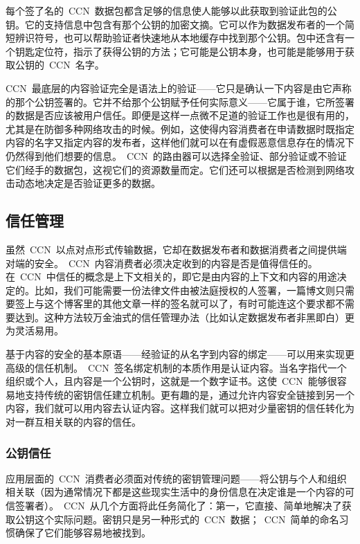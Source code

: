 每个签了名的~CCN~数据包都含足够的信息使人能够以此获取到验证此包的公钥。它的支持信息中包含有那个公钥的加密文摘。它可以作为数据发布者的一个简短辨识符号，也可以帮助验证者快速地从本地缓存中找到那个公钥。包中还含有一个钥匙定位符，指示了获得公钥的方法；它可能是公钥本身，也可能是能够用于获取公钥的~CCN~名字。

CCN~最底层的内容验证完全是语法上的验证——它只是确认一下内容是由它声称的那个公钥签署的。它并不给那个公钥赋予任何实际意义——它属于谁，它所签署的数据是否应该被用户信任。即便是这样一点微不足道的验证工作也是很有用的，尤其是在防御多种网络攻击的时候。例如，这使得内容消费者在申请数据时既指定内容的名字又指定内容的发布者，这样他们就可以在有虚假恶意信息存在的情况下仍然得到他们想要的信息。~CCN~的路由器可以选择全验证、部分验证或不验证它们经手的数据包，这视它们的资源数量而定。它们还可以根据是否检测到网络攻击动态地决定是否验证更多的数据。

\subsection{信任管理}
\label{sec:5.2}
虽然~CCN~以点对点形式传输数据，它却在数据发布者和数据消费者之间提供端对端的安全。~CCN~内容消费者必须决定收到的内容是否是值得信任的。在~CCN~中信任的概念是上下文相关的，即它是由内容的上下文和内容的用途决定的。比如，我们可能需要一份法律文件由被法庭授权的人签署，一篇博文则只需要签上与这个博客里的其他文章一样的签名就可以了，有时可能连这个要求都不需要达到。这种方法较万金油式的信任管理办法（比如认定数据发布者非黑即白）更为灵活易用。

基于内容的安全的基本原语——经验证的从名字到内容的绑定——可以用来实现更高级的信任机制。~CCN~签名绑定机制的本质作用是认证内容。当名字指代一个组织或个人，且内容是一个公钥时，这就是一个数字证书。这使~CCN~能够很容易地支持传统的密钥信任建立机制。更有趣的是，通过允许内容安全链接到另一个内容，我们就可以用内容去认证内容。这样我们就可以把对少量密钥的信任转化为对一群互相关联的内容的信任。

\subsubsection{公钥信任}
\label{sec:5.2.1}
应用层面的~CCN~消费者必须面对传统的密钥管理问题——将公钥与个人和组织相关联（因为通常情况下都是这些现实生活中的身份信息在决定谁是一个内容的可信签署者）。~CCN~从几个方面将此任务简化了：第一，它直接、简单地解决了获取公钥这个实际问题。密钥只是另一种形式的~CCN~数据；~CCN~简单的命名习惯确保了它们能够容易地被找到。


